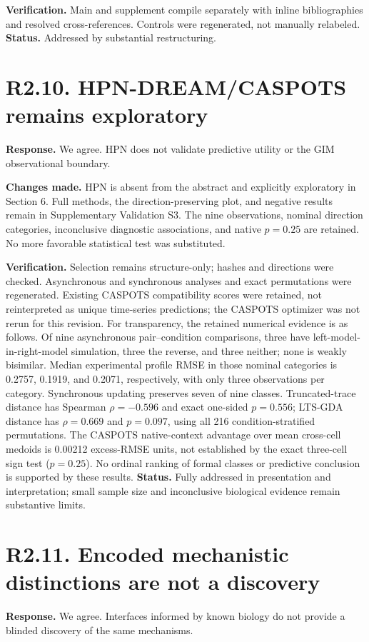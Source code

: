 \documentclass[11pt]{article}
\begin{document}
\textbf{Verification.} Main and supplement compile separately with inline
bibliographies and resolved cross-references. Controls were regenerated, not
manually relabeled.
\textbf{Status.} Addressed by substantial restructuring.

\section*{R2.10. HPN-DREAM/CASPOTS remains exploratory}
\textbf{Response.} We agree. HPN does not validate predictive utility or the
GIM observational boundary.

\textbf{Changes made.} HPN is absent from the abstract and explicitly
exploratory in Section 6. Full methods, the direction-preserving plot, and
negative results remain in Supplementary Validation S3. The nine observations,
nominal direction categories, inconclusive diagnostic associations, and native
$p=0.25$ are retained. No more favorable statistical test was substituted.

\textbf{Verification.} Selection remains structure-only; hashes and directions
were checked. Asynchronous and synchronous analyses and exact permutations were
regenerated. Existing CASPOTS compatibility scores were retained, not
reinterpreted as unique time-series predictions; the CASPOTS optimizer was
not rerun for this revision. For transparency, the retained numerical evidence
is as follows. Of nine asynchronous pair--condition comparisons, three have
left-model-in-right-model simulation, three the reverse, and three neither;
none is weakly bisimilar. Median experimental profile RMSE in those nominal
categories is 0.2757, 0.1919, and 0.2071, respectively, with only three
observations per category. Synchronous updating preserves seven of nine classes.
Truncated-trace distance has Spearman $\rho=-0.596$ and exact one-sided
$p=0.556$; LTS-GDA distance has $\rho=0.669$ and $p=0.097$, using all
216 condition-stratified permutations. The CASPOTS native-context advantage
over mean cross-cell medoids is 0.00212 excess-RMSE units, not established
by the exact three-cell sign test ($p=0.25$). No ordinal ranking of formal
classes or predictive conclusion is supported by these results.
\textbf{Status.} Fully addressed in presentation and interpretation; small
sample size and inconclusive biological evidence remain substantive limits.

\section*{R2.11. Encoded mechanistic distinctions are not a discovery}
\textbf{Response.} We agree. Interfaces informed by known biology do not provide
a blinded discovery of the same mechanisms.
\end{document}
